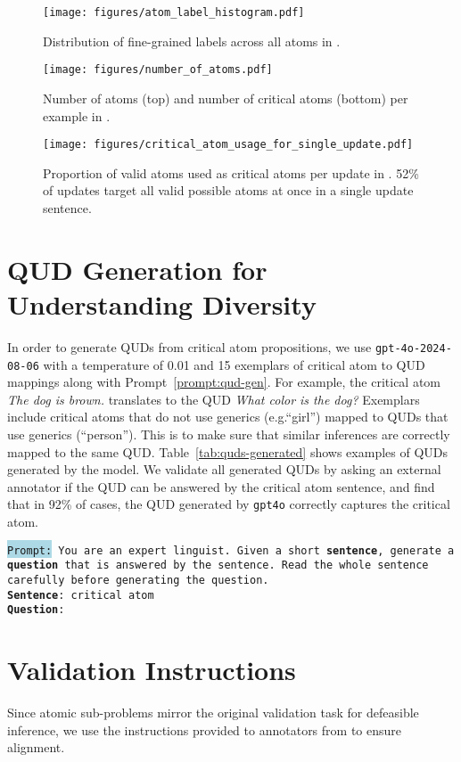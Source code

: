 \begin{figure}[t!]
\centering
\texttt{[image: figures/atom\_label\_histogram.pdf]}
\caption{Distribution of fine-grained labels across all atoms in \dsnlitest.}
\label{fig:atom-label-hist}
\end{figure}


\begin{figure}
\centering
\texttt{[image: figures/number\_of\_atoms.pdf]}
\caption{Number of atoms (top) and number of critical atoms (bottom) per example in \dsnlitest.}
\label{fig:num-atoms}
\end{figure}

\begin{figure}
\centering
\texttt{[image: figures/critical\_atom\_usage\_for\_single\_update.pdf]}
\caption{Proportion of valid atoms used as critical atoms per update in \dsnlitest. 52\% of updates target all valid possible atoms at once in a single update sentence.}

\label{fig:critical-atom-usage}
\end{figure}

\section{QUD Generation for Understanding Diversity}
\label{appendix:qud-diversity}



In order to generate QUDs from critical atom propositions, we use \texttt{gpt-4o-2024-08-06} with a temperature of 0.01 and 15 exemplars of critical atom to QUD mappings along with Prompt~\ref{prompt:qud-gen}.
%
For example, the critical atom \textit{The dog is brown.} translates to the QUD \textit{What color is the dog?} Exemplars include critical atoms that do not use generics (e.g.``girl'') mapped to QUDs that use generics (``person''). This is to make sure that similar inferences are correctly mapped to the same QUD. Table~\ref{tab:quds-generated} shows examples of QUDs generated by the model.
%
We validate all generated QUDs by asking an external annotator if the QUD can be answered by the critical atom sentence, and find that in 92\% of cases, the QUD generated by \texttt{gpt4o} correctly captures the critical atom.

\begin{prompt}[title={Prompt \thetcbcounter: QUD Generation}, label=prompt:qud-gen]
\texttt{\colorbox{lightblue}{Prompt:} You are an expert linguist. Given a short \textbf{sentence}, generate a \textbf{question} that is answered by the sentence. Read the whole sentence carefully before generating the question.\\\textbf{Sentence}: {critical 
atom}\\\textbf{Question}:}
\end{prompt}


\section{Validation Instructions}
\label{appendix:instructions}
Since atomic sub-problems mirror the original validation task for defeasible inference, we use the instructions provided to annotators from \citet{rudinger-etal-2020-thinking} to ensure alignment.


